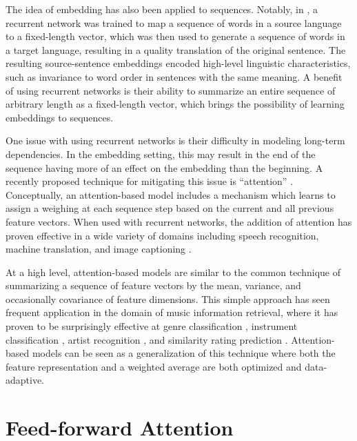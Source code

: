 \documentclass{article}
\begin{document}
The idea of embedding has also been applied to sequences.
Notably, in \cite{sutskever2014sequence}, a recurrent network was trained to map a sequence of words in a source language to a fixed-length vector, which was then used to generate a sequence of words in a target language, resulting in a quality translation of the original sentence.
The resulting source-sentence embeddings encoded high-level linguistic characteristics, such as invariance to word order in sentences with the same meaning.
A benefit of using recurrent networks is their ability to summarize an entire sequence of arbitrary length as a fixed-length vector, which brings the possibility of learning embeddings to sequences.

One issue with using recurrent networks is their difficulty in modeling long-term dependencies.
In the embedding setting, this may result in the end of the sequence having more of an effect on the embedding than the beginning.
A recently proposed technique for mitigating this issue is ``attention'' \cite{bahdanau2014neural}.
Conceptually, an attention-based model includes a mechanism which learns to assign a weighing at each sequence step based on the current and all previous feature vectors.
When used with recurrent networks, the addition of attention has proven effective in a wide variety of domains including speech recognition, machine translation, and image captioning \cite{cho2015describing}.

At a high level, attention-based models are similar to the common technique of summarizing a sequence of feature vectors by the mean, variance, and occasionally covariance of feature dimensions.
This simple approach has seen frequent application in the domain of music information retrieval, where it has proven to be surprisingly effective at genre classification \cite{bergstra2006aggregate, tzanetakis2002musical}, instrument classification \cite{deng2008study}, artist recognition \cite{mandel2005song}, and similarity rating prediction \cite{foster2014sequential}.
Attention-based models can be seen as a generalization of this technique where both the feature representation and a weighted average are both optimized and data-adaptive.

\section{Feed-forward Attention}
\label{sec:model}



\end{document}
